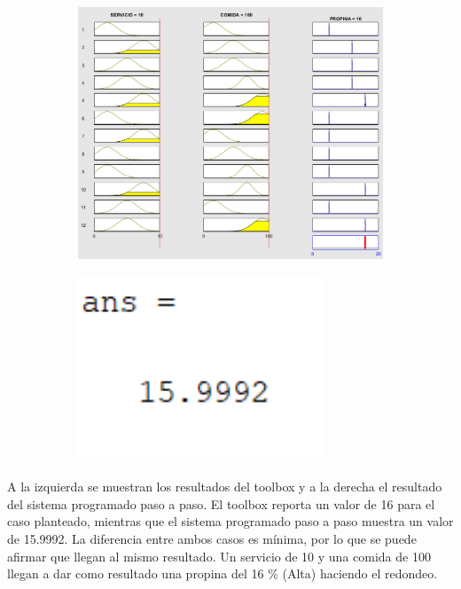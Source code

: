 \documentclass[11pt, letterpaper]{article}
\begin{document}
\begin{figure}[h]
	\centering
	\begin{subfigure}{0.40\textwidth} %
		\centering
		\includegraphics[width=1.4\textwidth]{IMG/RP13.png}
		\label{fig:G7}
	\end{subfigure}
	\hfill
	\begin{subfigure}{0.42\textwidth} %
		\centering
		\includegraphics[width=0.8\textwidth]{IMG/M13.png}
		\label{fig:G8}
	\end{subfigure}
	\label{fig:comparacion4}
\end{figure}

A la izquierda se muestran los resultados del toolbox y a la derecha el resultado del sistema programado paso a paso. El toolbox reporta un valor de 16 para el caso planteado, mientras que el sistema programado paso a paso muestra un valor de 15.9992. La diferencia entre ambos casos es mínima, por lo que se puede afirmar que llegan al mismo resultado. Un servicio de 10 y una comida de 100 llegan a dar como resultado una propina del 16 \% (Alta) haciendo el redondeo.
\end{document}
